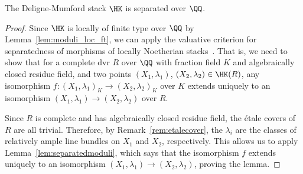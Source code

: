 \begin{lemma}\label{lem:moduli_separated}
The Deligne-Mumford stack $\HK$ is separated over $\QQ$.
\end{lemma}
\begin{proof}
Since $\HK$ is locally of finite type over $\QQ$ by Lemma~\ref{lem:moduli_loc_ft}, we can apply the valuative criterion for separatedness of morphisms of locally Noetherian stacks~\cite[Proposition~7.8]{LMB}. That is, we need to show that for a complete dvr $R$ over $\QQ$ with fraction field $K$ and algebraically closed residue field, and two points $(X_1,\lambda_1)$, $(X_2,\lambda_2) \in \HK(R)$, any isomorphism $f\colon (X_1,\lambda_1)_K \rightarrow (X_2,\lambda_2)_K$ over $K$ extends uniquely to an isomorphism $(X_1,\lambda_1) \rightarrow (X_2,\lambda_2)$ over $R$.

Since $R$ is complete and has algebraically closed residue field, the \'etale covers of $R$ are all trivial. Therefore, by Remark~\ref{rem:etalecover}, the $\lambda_i$ are the classes of relatively ample line bundles on $X_1$ and $X_2$, respectively. This allows us to apply Lemma~\ref{lem:separatedmoduli}, which says that the isomorphism $f$ extends uniquely to an isomorphism $(X_1,\lambda_1) \rightarrow (X_2,\lambda_2)$, proving the lemma.
\end{proof}

